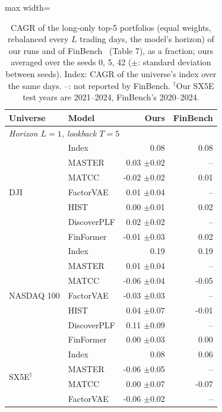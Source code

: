 \begin{table}[tb]
\centering
\caption{CAGR of the long-only top-5 portfolios (equal weights, rebalanced every $L$ trading days, the model's horizon) of our runs and of FinBench~\cite{pederzoli2026finbench} (Table 7), as a fraction; ours averaged over the seeds 0, 5, 42 ($\pm$: standard deviation between seeds). Index: CAGR of the universe's index over the same days. --: not reported by FinBench. $^\dagger$Our SX5E test years are 2021--2024, FinBench's 2020--2024.}
\begin{adjustbox}{max width=\textwidth}
{\normalsize
\setlength{\tabcolsep}{6pt}

\begin{tabular}{llrr}
\toprule
\textbf{Universe} & \textbf{Model} & \textbf{Ours} & \textbf{FinBench} \\
\midrule
\multicolumn{4}{l}{\textit{Horizon $L=1$, lookback $T=5$}} \\
\multirow{7}{*}{DJI} & Index & 0.08 & 0.08 \\
 & MASTER & 0.03 {\scriptsize$\pm$0.02} & -- \\
 & MATCC & -0.02 {\scriptsize$\pm$0.02} & 0.01 \\
 & FactorVAE & 0.01 {\scriptsize$\pm$0.04} & -- \\
 & HIST & 0.00 {\scriptsize$\pm$0.01} & 0.02 \\
 & DiscoverPLF & 0.02 {\scriptsize$\pm$0.02} & -- \\
 & FinFormer & -0.01 {\scriptsize$\pm$0.03} & 0.02 \\
\midrule
\multirow{7}{*}{NASDAQ 100} & Index & 0.19 & 0.19 \\
 & MASTER & 0.01 {\scriptsize$\pm$0.04} & -- \\
 & MATCC & -0.06 {\scriptsize$\pm$0.04} & -0.05 \\
 & FactorVAE & -0.03 {\scriptsize$\pm$0.03} & -- \\
 & HIST & 0.04 {\scriptsize$\pm$0.07} & -0.01 \\
 & DiscoverPLF & 0.11 {\scriptsize$\pm$0.09} & -- \\
 & FinFormer & 0.00 {\scriptsize$\pm$0.03} & 0.00 \\
\midrule
\multirow{7}{*}{SX5E$^\dagger$} & Index & 0.08 & 0.06 \\
 & MASTER & -0.06 {\scriptsize$\pm$0.05} & -- \\
 & MATCC & 0.00 {\scriptsize$\pm$0.07} & -0.07 \\
 & FactorVAE & -0.06 {\scriptsize$\pm$0.02} & -- \\

\end{tabular}}
\end{adjustbox}
\end{table}
